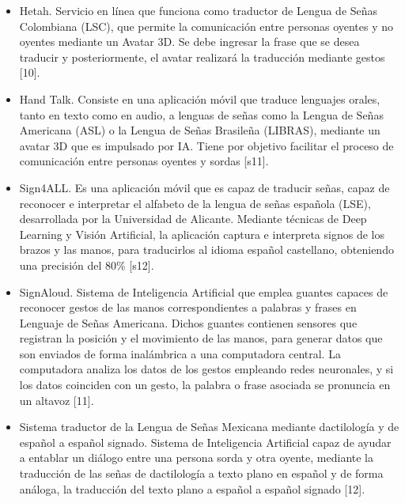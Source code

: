 \begin{itemize}
\item Hetah. Servicio en línea que funciona como traductor de Lengua de Señas Colombiana (LSC), que permite la comunicación entre personas oyentes y no oyentes mediante un Avatar 3D. Se debe ingresar la frase que se desea traducir y posteriormente, el avatar realizará la traducción mediante gestos [10]. 
\item Hand Talk. Consiste en una aplicación móvil que traduce lenguajes orales, tanto en texto como en audio, a lenguas de señas como la Lengua de Señas Americana (ASL) o la Lengua de Señas Brasileña (LIBRAS), mediante un avatar 3D que es impulsado por IA. Tiene por objetivo facilitar el proceso de comunicación entre personas oyentes y sordas [s11]. 
\item Sign4ALL. Es una aplicación móvil que es capaz de traducir señas, capaz de reconocer e interpretar el alfabeto de la lengua de señas española (LSE), desarrollada por la Universidad de Alicante. Mediante técnicas de Deep Learning y Visión Artificial, la aplicación captura e interpreta signos de los brazos y las manos, para traducirlos al idioma español castellano, obteniendo una precisión del 80\% [s12].
\item SignAloud. Sistema de Inteligencia Artificial que emplea guantes capaces de reconocer gestos de las manos correspondientes a palabras y frases en Lenguaje de Señas Americana. Dichos guantes contienen sensores que registran la posición y el movimiento de las manos, para generar datos que son enviados de forma inalámbrica a una computadora central. La computadora analiza los datos de los gestos empleando redes neuronales, y si los datos coinciden con un gesto, la palabra o frase asociada se pronuncia en un altavoz [11].
\item Sistema traductor de la Lengua de Señas Mexicana mediante dactilología y de español a español signado. Sistema de Inteligencia Artificial capaz de ayudar a entablar un diálogo entre una persona sorda y otra oyente, mediante la traducción de las señas de dactilología a texto plano en español y de forma análoga, la traducción del texto plano a español a español signado [12].
\end{itemize}

